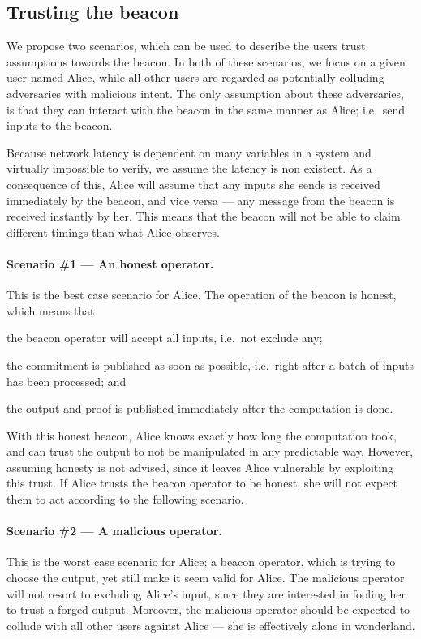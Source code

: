 \subsection{Trusting the beacon}%
\label{sub:trusting_the_beacon}

We propose two scenarios, which can be used to describe the users trust assumptions towards the beacon.
In both of these scenarios, we focus on a given user named Alice, while all other users are regarded as potentially colluding adversaries with malicious intent.
The only assumption about these adversaries, is that they can interact with the beacon in the same manner as Alice; i.e.\ send inputs to the beacon.

Because network latency is dependent on many variables in a system and virtually impossible to verify, we assume the latency is non existent.
As a consequence of this, Alice will assume that any inputs she sends is received immediately by the beacon, and vice versa --- any message from the beacon is received instantly by her.
This means that the beacon will not be able to claim different timings than what Alice observes.

\paragraph{Scenario \#1 --- An honest operator.}
This is the best case scenario for Alice.
The operation of the beacon is honest, which means that
\begin{eletterate*}
\item the beacon operator will accept all inputs, i.e.\ not exclude any;
\item the commitment is published as soon as possible, i.e.\ right after a batch of inputs has been processed; and
\item the output and proof is published immediately after the computation is done.
\end{eletterate*}

With this honest beacon, Alice knows exactly how long the computation took, and can trust the output to not be manipulated in any predictable way.
However, assuming honesty is not advised, since it leaves Alice vulnerable by exploiting this trust.
If Alice trusts the beacon operator to be honest, she will not expect them to act according to the following scenario.

\paragraph{Scenario \#2 --- A malicious operator.}
This is the worst case scenario for Alice; a beacon operator, which is trying to choose the output, yet still make it seem valid for Alice.
The malicious operator will not resort to excluding Alice's input, since they are interested in fooling her to trust a forged output.
Moreover, the malicious operator should be expected to collude with all other users against Alice --- she is effectively alone in wonderland.

